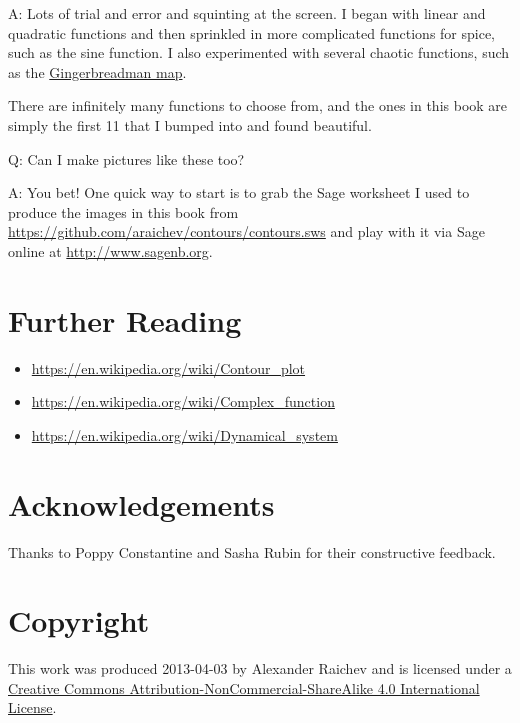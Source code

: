 \documentclass[12pt, a4paper]{amsart}
\begin{document}
A: Lots of trial and error and squinting at the screen.
I began with linear and quadratic functions and then sprinkled in more complicated functions for spice, such as the sine function.
I also experimented with several chaotic functions, such as the \href{https://en.wikipedia.org/wiki/Gingerbreadman_map}{Gingerbreadman map}.

There are infinitely many functions to choose from, and the ones in this book are simply the first 11 that I bumped into and found beautiful.

Q: Can I make pictures like these too?

A: You bet!
One quick way to start is to grab the Sage worksheet I used to produce the images in this book from \url{https://github.com/araichev/contours/contours.sws} and play with it via Sage online at \url{http://www.sagenb.org}.
\section*{Further Reading}

\begin{itemize}
    \item \url{https://en.wikipedia.org/wiki/Contour_plot}
    \item \url{https://en.wikipedia.org/wiki/Complex_function} 
    \item \url{https://en.wikipedia.org/wiki/Dynamical_system}
\end{itemize}
\section*{Acknowledgements}

Thanks to Poppy Constantine and Sasha Rubin for their constructive feedback.

\section*{Copyright}

This work was produced 2013-04-03 by Alexander Raichev and is licensed under a \href{http://creativecommons.org/licenses/by-nc-sa/4.0/}{Creative Commons Attribution-NonCommercial-ShareAlike 4.0 International License}.
\end{document}
